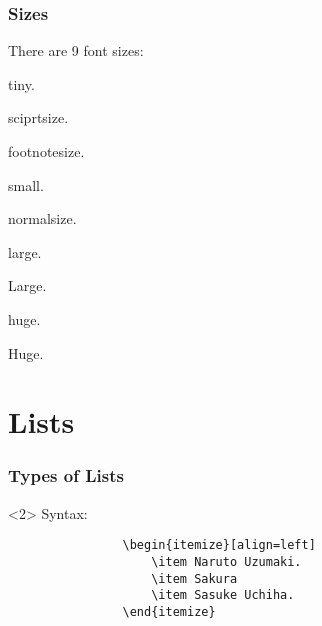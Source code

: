 \documentclass{beamer}
\begin{document}
	\begin{frame}[t]
		\frametitle{Sizes}
			\vfill
			There are 9 font sizes:
			\vfill
			\begin{description}[align=left, margin=0.5cm]
				\item<+->[\tiny \texttt{\tiny}] \tiny{tiny}.
				\item<+->[\texttt{\scriptsize}] \scriptsize{sciprtsize}.
				\item<+->[\texttt{\footnotesize}] \footnotesize{footnotesize}.
				\item<+->[\texttt{\small}] \small{small}.
				\item<+->[\texttt{\normalsize}] \normalsize{normalsize}.
				\item<+->[\texttt{\large}] \large{large}.
				\item<+->[\texttt{\Large}] \Large{Large}.
				\item<+->[\texttt{\huge}] \huge{huge}.
				\item<+->[\texttt{\Huge}] \Huge{Huge}.
			\end{description}
			\vfill
	\end{frame}

	\section{Lists}
	\begin{frame}[fragile]
		\frametitle{Types of Lists}
		\begin{onlyenv}<2>
			Syntax:
			\begin{verbatim}
				\begin{itemize}[align=left]
					\item Naruto Uzumaki.
					\item Sakura
					\item Sasuke Uchiha.
				\end{itemize}
			\end{verbatim}
		\end{onlyenv}
	\end{frame}
\end{document}
